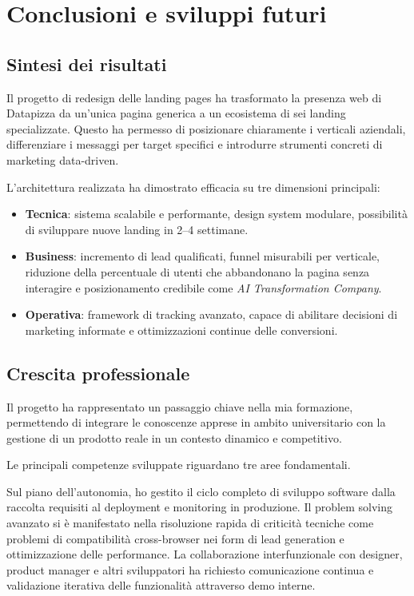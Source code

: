 \chapter{Conclusioni e sviluppi futuri}

\section{Sintesi dei risultati}
Il progetto di redesign delle landing pages ha trasformato la presenza web di Datapizza
da un'unica pagina generica a un ecosistema di sei landing specializzate. 
Questo ha permesso di posizionare chiaramente i verticali aziendali, differenziare i messaggi
per target specifici e introdurre strumenti concreti di marketing data-driven.

L'architettura realizzata ha dimostrato efficacia su tre dimensioni principali:
\begin{itemize}
  \item \textbf{Tecnica}: sistema scalabile e performante, design system modulare, 
        possibilità di sviluppare nuove landing in 2--4 settimane.
  \item \textbf{Business}: incremento di lead qualificati, funnel misurabili per verticale,
        riduzione della percentuale di utenti che abbandonano la pagina senza interagire 
        e posizionamento credibile come \textit{AI Transformation Company}.
  \item \textbf{Operativa}: framework di tracking avanzato, capace di abilitare decisioni di marketing informate
        e ottimizzazioni continue delle conversioni.
\end{itemize}

\section{Crescita professionale}
Il progetto ha rappresentato un passaggio chiave nella mia formazione,
permettendo di integrare le conoscenze apprese in ambito universitario con la gestione
di un prodotto reale in un contesto dinamico e competitivo.

\medskip
Le principali competenze sviluppate riguardano tre aree fondamentali. 

Sul piano 
dell'autonomia, ho gestito il ciclo completo di sviluppo software dalla raccolta 
requisiti al deployment e monitoring in produzione. Il problem solving avanzato 
si è manifestato nella risoluzione rapida di criticità tecniche come problemi di 
compatibilità cross-browser nei form di lead generation e ottimizzazione delle 
performance. La collaborazione interfunzionale con designer, product manager e 
altri sviluppatori ha richiesto comunicazione continua e validazione iterativa 
delle funzionalità attraverso demo interne.

